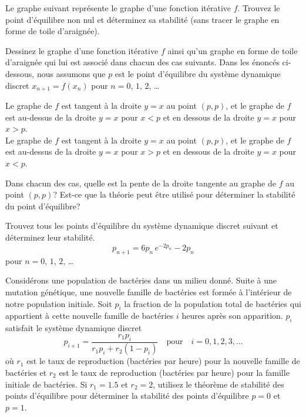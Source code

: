 \begin{question}[\life]
Le graphe suivant représente le graphe d'une fonction itérative $f$.
Trouvez le point d'équilibre non nul et déterminez sa stabilité (sans
tracer le graphe en forme de toile d'araignée).
\label{6Q101}
\end{question}

\begin{question}[\life]
Dessinez le graphe d'une fonction itérative $f$ ainsi qu'un graphe en
forme de toile d'araignée qui lui est associé dans chacun des cas
suivants.  Dans les énoncés ci-dessous, nous assumons que $p$ est le point
d'équilibre du système dynamique discret $x_{n+1} = f(x_n)$ pour
$n=0$, $1$, $2$, \ldots

 Le graphe de $f$ est tangent à la droite $y=x$ au point
$(p,p)$, et le graphe de $f$ est au-dessus de la droite $y=x$ pour
$x<p$ et en dessous de la droite $y=x$ pour $x>p$.\\
 Le graphe de $f$ est tangent à la droite $y=x$ au point
$(p,p)$, et le graphe de $f$ est au-dessus de la droite $y=x$ pour
$x>p$ et en dessous de la droite $y=x$ pour $x<p$.

Dans chacun des cas, quelle est la pente de la droite tangente au
graphe de $f$ au point $(p,p)$?  Est-ce que la théorie peut être
utilisé pour déterminer la stabilité du point d'équilibre?
\label{6Q102}
\end{question}

\begin{question}[\life]
Trouvez tous les points d'équilibre du système dynamique discret
suivant et déterminez leur stabilité.
\[
p_{n+1} = 6 p_n\, e^{-2p_n} - 2 p_n
\]
pour $n=0$, $1$, $2$, \ldots  
\label{6Q103}
\end{question}

\begin{question}[\life]
Considérons une population de bactéries dans un milieu donné.  Suite à une
mutation génétique, une nouvelle famille de bactéries est formée à 
l'intérieur de notre population initiale.  Soit $p_i$ la fraction de la
population total de bactéries qui appartient à cette nouvelle famille de
bactéries $i$ heures après son apparition.  $p_i$ satisfait le
système dynamique discret
\[
p_{i+1} = \frac{r_1 p_i}{r_1 p_i + r_2 (1-p_i)} \quad \text{pour}
\quad i =0, 1, 2, 3, \ldots
\]
où $r_1$ est le taux de reproduction (bactéries par heure) pour la
nouvelle famille de bactéries et $r_2$ est le taux de reproduction
(bactéries par heure) pour la famille initiale de bactéries.  Si $r_1 = 1.5$
et $r_2 = 2$, utilisez le théorème de stabilité des points d'équilibre pour
déterminer la stabilité des points d'équilibre $p=0$ et $p=1$.
\label{6Q104}
\end{question}

